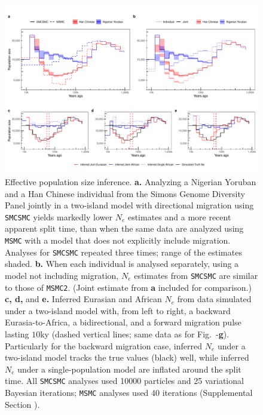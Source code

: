 \begin{figure}
	\centering
	\includegraphics[width=\textwidth]{plot/new_ne_figure.pdf}
	\caption[Effective Population Size Inference]{Effective population size inference. {\bf a.} Analyzing a Nigerian Yoruban and a Han Chinese individual from the Simons Genome Diversity Panel jointly in a two-island model with directional migration using {\tt SMCSMC} yields markedly lower $N_e$ estimates and a more recent apparent split time, than when the same data are analyzed using {\tt MSMC} with a model that does not explicitly include migration. Analyses for {\tt SMCSMC} repeated three times; range of the estimates shaded. {\bf b.} When each individual is analysed separately, using a model not including migration, $N_e$ estimates from {\tt SMCSMC} are similar to those of {\tt MSMC2}. (Joint estimate from {\bf a} included for comparison.) {\bf c, d,} and {\bf e.} 
	Inferred Eurasian and African $N_e$ from data simulated under a two-island model with, from left to right, a backward Eurasia-to-Africa, a bidirectional, and a forward  migration pulse lasting $10$ky (dashed vertical lines; same data as for Fig.\ -{\bf g}).  Particularly for the backward migration case, inferred $N_e$ under a two-island model tracks the true values (black) well, while inferred $N_e$ under a single-population model are inflated around the split time.
 All {\tt SMCSMC} analyses used 10000 particles and 25 variational Bayesian iterations; {\tt MSMC} analyses used 40 iterations (Supplemental Section ).}

\end{figure}
